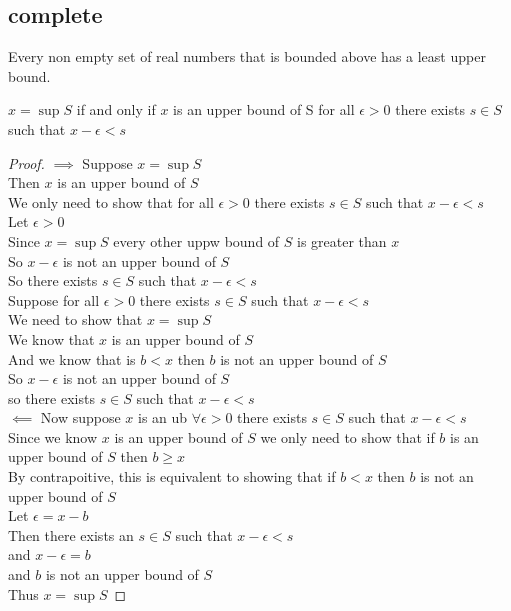 \documentclass[answers,12pt,addpoints]{exam}
\begin{document}
\subsection{complete}
Every non empty set of real numbers that is bounded above has a least upper bound. \\
\begin{theorem}
    $x = \sup S$ if and only if $x$ is an upper bound of S for all $\epsilon > 0$ there exists $s \in S$ such that $x-\epsilon < s$
    \begin{proof}
        $\implies$ Suppose $x = \sup S$ \\
        Then $x$ is an upper bound of $S$ \\
        We only need to show that for all $\epsilon > 0$ there exists $s \in S$ such that $x-\epsilon < s$ \\
        Let $\epsilon > 0$ \\
        Since $x = \sup S$ every other uppw bound of $S$ is greater than $x$ \\
        So $x-\epsilon$ is not an upper bound of $S$ \\
        So there exists $s \in S$ such that $x-\epsilon < s$ \\
        Suppose for all $\epsilon > 0$ there exists $s \in S$ such that $x-\epsilon < s$ \\
        We need to show that $x = \sup S$ \\
        We know that $x$ is an upper bound of $S$ \\
        And we know that is $b < x$ then $b$ is not an upper bound of $S$ \\
        So $x- \epsilon$ is not an upper bound of $S$ \\
        so there exists $s \in S$ such that $x-\epsilon < s$ \\
        $\impliedby$ Now suppose $x$ is an ub $\forall \epsilon > 0$ there exists $s \in S$ such that $x-\epsilon < s$ \\
        Since we know $x$ is an upper bound of $S$ we only need to show that if $b$ is an upper bound of $S$ then $b \geq x$ \\
        By contrapoitive, this is equivalent to showing that if $b < x$ then $b$ is not an upper bound of $S$ \\
        Let $\epsilon = x-b$ \\
        Then there exists an $s \in S$ such that $x-\epsilon < s$ \\
        and $x - \epsilon = b$ \\ 
        and $b$ is not an upper bound of $S$ \\
        Thus $x = \sup S$
    \end{proof}
\end{theorem}
\end{document}
